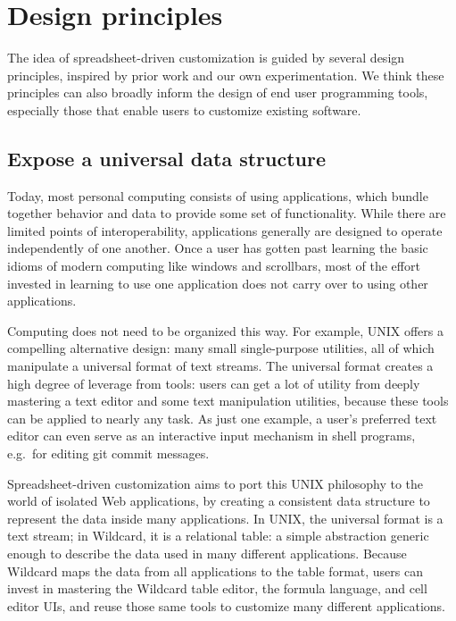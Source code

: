 \documentclass[english,submission]{programming}
\begin{document}
\hypertarget{design-principles}{%
\section{Design principles}\label{design-principles}}

The idea of spreadsheet-driven customization is guided by several design
principles, inspired by prior work and our own experimentation. We think
these principles can also broadly inform the design of end user
programming tools, especially those that enable users to customize
existing software.

\hypertarget{expose-a-universal-data-structure}{%
\subsection{Expose a universal data
structure}\label{expose-a-universal-data-structure}}

Today, most personal computing consists of using applications, which
bundle together behavior and data to provide some set of functionality.
While there are limited points of interoperability, applications
generally are designed to operate independently of one another. Once a
user has gotten past learning the basic idioms of modern computing like
windows and scrollbars, most of the effort invested in learning to use
one application does not carry over to using other applications.

Computing does not need to be organized this way. For example, UNIX
offers a compelling alternative design: many small single-purpose
utilities, all of which manipulate a universal format of text streams.
The universal format creates a high degree of leverage from tools: users
can get a lot of utility from deeply mastering a text editor and some
text manipulation utilities, because these tools can be applied to
nearly any task. As just one example, a user's preferred text editor can
even serve as an interactive input mechanism in shell programs, e.g.~for
editing git commit messages.

Spreadsheet-driven customization aims to port this UNIX philosophy to
the world of isolated Web applications, by creating a consistent data
structure to represent the data inside many applications. In UNIX, the
universal format is a text stream; in Wildcard, it is a relational
table: a simple abstraction generic enough to describe the data used in
many different applications. Because Wildcard maps the data from all
applications to the table format, users can invest in mastering the
Wildcard table editor, the formula language, and cell editor UIs, and
reuse those same tools to customize many different applications.
\end{document}
